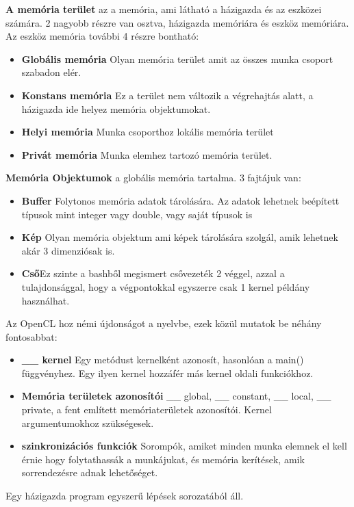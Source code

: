\textbf{A memória terület} az a memória, ami látható a házigazda és az eszközei számára. 2 nagyobb részre van osztva, házigazda memóriára és eszköz memóriára. Az eszköz memória további 4 részre bontható:
\begin{itemize}
\item\textbf{Globális memória} Olyan memória terület amit az összes munka csoport szabadon elér.
\item\textbf{Konstans memória} Ez a terület nem változik a végrehajtás alatt, a házigazda ide helyez memória objektumokat.
\item\textbf{Helyi memória} Munka csoporthoz lokális memória terület
\item\textbf{Privát memória} Munka elemhez tartozó memória terület.
\end{itemize}
\textbf{Memória Objektumok} a globális memória tartalma. 3 fajtájuk van:
\begin{itemize}
\item\textbf{Buffer} Folytonos memória adatok tárolására. Az adatok lehetnek beépített típusok mint integer vagy double, vagy saját típusok is
\item\textbf{Kép} Olyan memória objektum ami képek tárolására szolgál, amik lehetnek akár 3 dimenziósak is.
\item\textbf{Cső}Ez szinte a bashből megismert csővezeték 2 véggel, azzal a tulajdonsággal, hogy a végpontokkal egyszerre csak 1 kernel példány használhat.
\end{itemize}

Az OpenCL hoz némi újdonságot a nyelvbe, ezek közül mutatok be néhány fontosabbat:
\begin{itemize}
\item\textbf{\_\_ kernel} Egy metódust kernelként azonosít, hasonlóan a main() függvényhez. Egy ilyen kernel hozzáfér más kernel oldali funkciókhoz.
\item\textbf{Memória területek azonosítói} \_\_ global, \_\_ constant, \_\_ local, \_\_ private, a fent említett memóriaterületek azonosítói. Kernel argumentumokhoz szükségesek.
\item\textbf{szinkronizációs funkciók} Sorompók, amiket minden munka elemnek el kell érnie hogy folytathassák a munkájukat, és memória kerítések, amik sorrendezésre adnak lehetőséget.
\end{itemize}

Egy házigazda program egyszerű lépések sorozatából áll.

